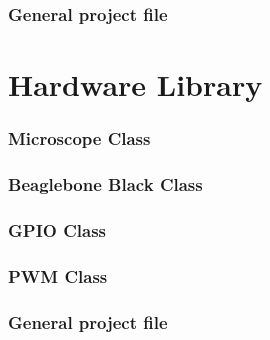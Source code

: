 \documentclass[11pt,fleqn,,a4paper,twoside,openright]{book} %
\begin{document}
\subsection{General project file}

\newpage

\newpage

\newpage

\newpage

\newpage

\newpage


\chapter{Hardware Library}
\subsection{Microscope Class}

\newpage

\newpage
\subsection{Beaglebone Black Class}

\newpage

\newpage
\subsection{GPIO Class}

\newpage

\newpage
\subsection{PWM Class}

\newpage

\newpage
\subsection{General project file}

\newpage

\newpage

\newpage

\newpage

\newpage

\newpage

\end{document}
